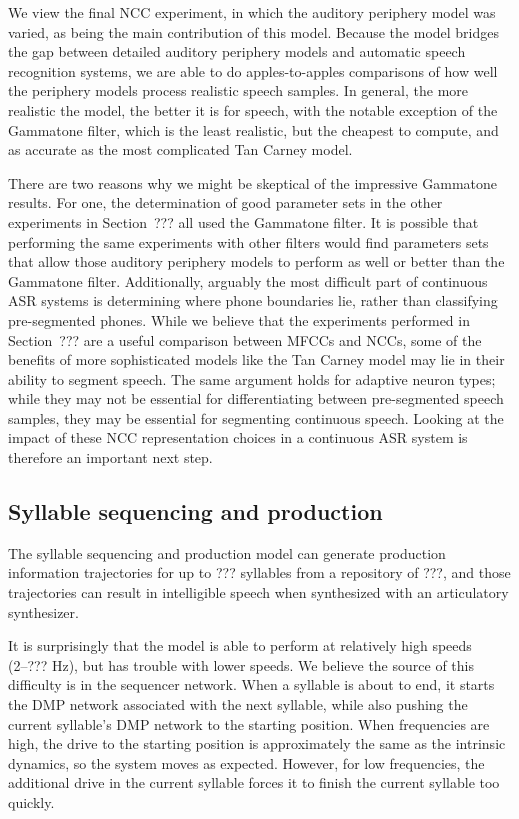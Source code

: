 We view the final NCC experiment,
in which the auditory periphery model was varied,
as being the main contribution
of this model.
Because the model bridges the gap
between detailed auditory periphery models
and automatic speech recognition systems,
we are able to do apples-to-apples comparisons
of how well the periphery models
process realistic speech samples.
In general, the more realistic the model,
the better it is for speech,
with the notable exception of the Gammatone filter,
which is the least realistic,
but the cheapest to compute,
and as accurate as
the most complicated Tan Carney model.

There are two reasons why we might
be skeptical of the impressive Gammatone results.
For one, the determination of good parameter sets
in the other experiments in Section~???
all used the Gammatone filter.
It is possible that performing the same
experiments with other filters
would find parameters sets that
allow those auditory periphery models
to perform as well or better than
the Gammatone filter.
Additionally, arguably the most difficult part
of continuous ASR systems is
determining where phone boundaries lie,
rather than classifying pre-segmented phones.
While we believe that the experiments
performed in Section~???
are a useful comparison between MFCCs and NCCs,
some of the benefits of more sophisticated models
like the Tan Carney model
may lie in their ability to segment speech.
The same argument holds
for adaptive neuron types;
while they may not be essential
for differentiating between pre-segmented speech samples,
they may be essential for
segmenting continuous speech.
Looking at the impact of these
NCC representation choices
in a continuous ASR system
is therefore an important next step.

\subsection{Syllable sequencing and production}

The syllable sequencing and production model
can generate production information trajectories
for up to ??? syllables from a repository of ???,
and those trajectories can result in
intelligible speech when synthesized
with an articulatory synthesizer.

It is surprisingly that the model is able
to perform at relatively high speeds
(2--??? Hz),
but has trouble with lower speeds.
We believe the source of this difficulty
is in the sequencer network.
When a syllable is about to end,
it starts the DMP network
associated with the next syllable,
while also pushing the current syllable's
DMP network to the starting position.
When frequencies are high,
the drive to the starting position
is approximately the same as the
intrinsic dynamics, so the system
moves as expected.
However, for low frequencies,
the additional drive in the current syllable
forces it to finish the current syllable
too quickly.

